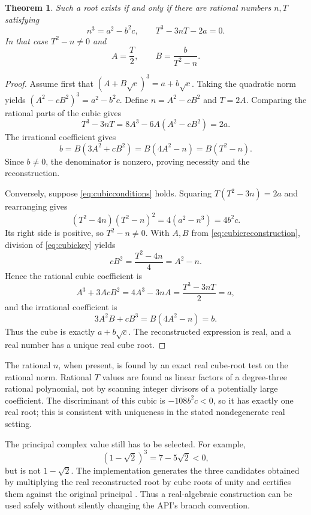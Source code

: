 \documentclass[11pt,letterpaper]{article}
\newcommand{\code}[1]{\texttt{\detokenize{#1}}}
\newtheorem{theorem}{Theorem}[section]
\theoremstyle{definition}
\theoremstyle{remark}
\begin{document}
\begin{theorem}\label{thm:cubic}
Such a root exists if and only if there are rational numbers $n,T$ satisfying
\begin{equation}\label{eq:cubicconditions}
 n^3=a^2-b^2c,\qquad T^3-3nT-2a=0.
\end{equation}
In that case $T^2-n\ne0$ and
\begin{equation}\label{eq:cubicreconstruction}
 A=\frac T2,\qquad B=\frac{b}{T^2-n}.
\end{equation}
\end{theorem}
\begin{proof}
Assume first that $(A+B\sqrt c)^3=a+b\sqrt c$. Taking the quadratic norm yields $(A^2-cB^2)^3=a^2-b^2c$. Define $n=A^2-cB^2$ and $T=2A$. Comparing the rational parts of the cubic gives
\[
 T^3-3nT=8A^3-6A(A^2-cB^2)=2a.
\]
The irrational coefficient gives
\[
 b=B(3A^2+cB^2)=B(4A^2-n)=B(T^2-n).
\]
Since $b\ne0$, the denominator is nonzero, proving necessity and the reconstruction.

Conversely, suppose \eqref{eq:cubicconditions} holds. Squaring $T(T^2-3n)=2a$ and rearranging gives
\begin{equation}\label{eq:cubickey}
 (T^2-4n)(T^2-n)^2=4(a^2-n^3)=4b^2c.
\end{equation}
Its right side is positive, so $T^2-n\ne0$. With $A,B$ from \eqref{eq:cubicreconstruction}, division of \eqref{eq:cubickey} yields
\[
 cB^2=\frac{T^2-4n}{4}=A^2-n.
\]
Hence the rational cubic coefficient is
\[
 A^3+3AcB^2=4A^3-3nA
 =\frac{T^3-3nT}{2}=a,
\]
and the irrational coefficient is
\[
 3A^2B+cB^3=B(4A^2-n)=b.
\]
Thus the cube is exactly $a+b\sqrt c$. The reconstructed expression is real, and a real number has a unique real cube root.
\end{proof}

The rational $n$, when present, is found by an exact real cube-root test on the rational norm. Rational $T$ values are found as linear factors of a degree-three rational polynomial, not by scanning integer divisors of a potentially large coefficient. The discriminant of this cubic is $-108b^2c<0$, so it has exactly one real root; this is consistent with uniqueness in the stated nondegenerate real setting.

The principal complex value still has to be selected. For example,
\[
 (1-\sqrt2)^3=7-5\sqrt2<0,
\]
but \code{(7-5 Sqrt[2])^(1/3)} is not $1-\sqrt2$. The implementation generates the three candidates obtained by multiplying the real reconstructed root by cube roots of unity and certifies them against the original principal \code{Power}. Thus a real-algebraic construction can be used safely without silently changing the API's branch convention.
\end{document}
